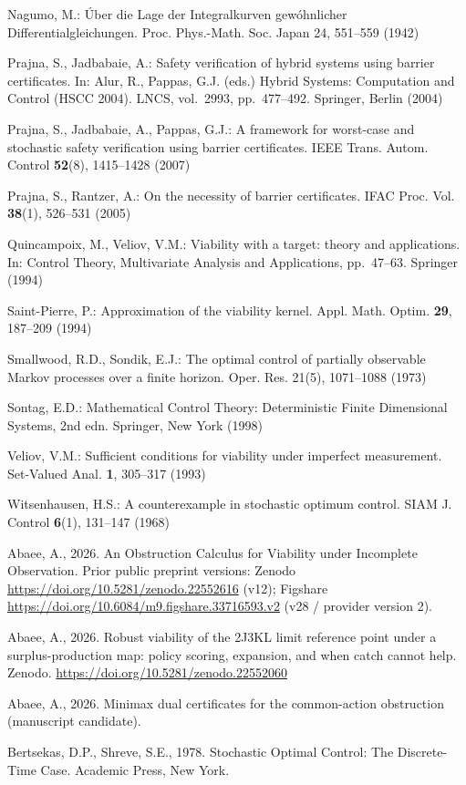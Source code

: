 \documentclass[10pt,twocolumn]{article}
\theoremstyle{definition}
\begin{document}
{Nagumo, M.: \'Uber die Lage der Integralkurven gew\'ohnlicher
Differentialgleichungen. Proc. Phys.-Math. Soc. Japan 24, 551--559
(1942)

Prajna, S., Jadbabaie, A.: Safety verification of hybrid systems using
barrier certificates. In: Alur, R., Pappas, G.J. (eds.) Hybrid Systems:
Computation and Control (HSCC 2004). LNCS, vol.~2993, pp.~477--492.
Springer, Berlin (2004)

Prajna, S., Jadbabaie, A., Pappas, G.J.: A framework for worst-case and
stochastic safety verification using barrier certificates. IEEE Trans.
Autom. Control \textbf{52}(8), 1415--1428 (2007)

Prajna, S., Rantzer, A.: On the necessity of barrier certificates. IFAC
Proc. Vol. \textbf{38}(1), 526--531 (2005)

Quincampoix, M., Veliov, V.M.: Viability with a target: theory and
applications. In: Control Theory, Multivariate Analysis and
Applications, pp.~47--63. Springer (1994)

Saint-Pierre, P.: Approximation of the viability kernel. Appl. Math.
Optim. \textbf{29}, 187--209 (1994)

Smallwood, R.D., Sondik, E.J.: The optimal control of partially
observable Markov processes over a finite horizon. Oper. Res. 21(5),
1071--1088 (1973)

Sontag, E.D.: Mathematical Control Theory: Deterministic Finite Dimensional Systems, 2nd edn. Springer, New York (1998)

Veliov, V.M.: Sufficient conditions for viability under imperfect
measurement. Set-Valued Anal. \textbf{1}, 305--317 (1993)

Witsenhausen, H.S.: A counterexample in stochastic optimum control.
SIAM J. Control \textbf{6}(1), 131--147 (1968)

Abaee, A., 2026. An Obstruction Calculus for Viability under Incomplete Observation. Prior public preprint versions: Zenodo \url{https://doi.org/10.5281/zenodo.22552616} (v12); Figshare \url{https://doi.org/10.6084/m9.figshare.33716593.v2} (v28 / provider version 2).

Abaee, A., 2026. Robust viability of the 2J3KL limit reference point
under a surplus-production map: policy scoring, expansion, and when
catch cannot help. Zenodo.
\url{https://doi.org/10.5281/zenodo.22552060}

Abaee, A., 2026. Minimax dual certificates for the common-action
obstruction (manuscript candidate).

Bertsekas, D.P., Shreve, S.E., 1978. Stochastic Optimal Control: The
Discrete-Time Case. Academic Press, New York.

}
\end{document}
